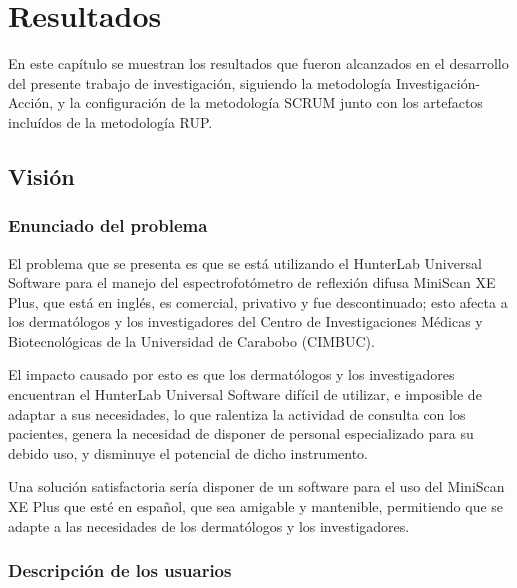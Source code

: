 \chapter{Resultados}

En este cap\'{i}tulo se muestran los resultados que fueron alcanzados en el desarrollo del presente trabajo de investigaci\'{o}n, siguiendo la metodolog\'{i}a Investigaci\'{o}n-Acci\'{o}n, y la configuraci\'{o}n de la metodolog\'{i}a SCRUM junto con los artefactos inclu\'{i}dos de la metodolog\'{i}a RUP.

\section{Visi\'{o}n}
	
	\subsection{Enunciado del problema}
	
	El problema que se presenta es que se est\'{a} utilizando el HunterLab Universal Software para el manejo del espectrofot\'{o}metro de reflexi\'{o}n difusa MiniScan XE Plus, que est\'{a} en ingl\'{e}s, es comercial, privativo y fue descontinuado; esto afecta a los dermat\'{o}logos y los investigadores del Centro de Investigaciones M\'{e}dicas y Biotecnol\'{o}gicas de la Universidad de Carabobo (CIMBUC).
	
	El impacto causado por esto es que los dermat\'{o}logos y los investigadores encuentran el HunterLab Universal Software dif\'{i}cil de utilizar, e imposible de adaptar a sus necesidades, lo que ralentiza la actividad de consulta con los pacientes, genera la necesidad de disponer de personal especializado para su debido uso, y disminuye el potencial de dicho instrumento.
	
	Una soluci\'{o}n satisfactoria ser\'{i}a disponer de un software para el uso del \mbox{MiniScan} XE Plus que est\'{e} en espa\~{n}ol, que sea amigable y mantenible, permitiendo que se adapte a las necesidades de los dermat\'{o}logos y los investigadores.
	
	\subsection{Descripci\'{o}n de los usuarios}
	
